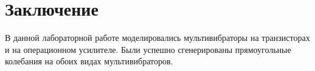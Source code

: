 \section*{Заключение}

В данной лабораторной работе моделировались мультивибраторы на транзисторах и на операционном усилителе.
Были успешно сгенерированы прямоугольные колебания на обоих видах мультивибраторов.